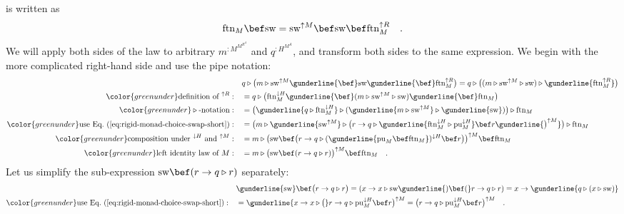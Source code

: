 is written as
\begin{equation}
\text{ftn}_{M}\bef\text{sw}=\text{sw}^{\uparrow M}\bef\text{sw}\bef\text{ftn}_{M}^{\uparrow R}\quad.\label{eq:swap-law-4-formulation-R-M}
\end{equation}
We will apply both sides of the law to arbitrary $m^{:M^{M^{R^{A}}}}$
and $q^{:H^{M^{A}}}$, and transform both sides to the same expression.
We begin with the more complicated right-hand side and use the pipe
notation:
\begin{align}
 & q\triangleright\big(m\triangleright\text{sw}^{\uparrow M}\gunderline{\bef}\text{sw}\gunderline{\bef}\text{ftn}_{M}^{\uparrow R}\big)=q\triangleright\big((m\triangleright\text{sw}^{\uparrow M}\triangleright\text{sw})\triangleright\gunderline{\text{ftn}_{M}^{\uparrow R}}\big)\nonumber \\
{\color{greenunder}\text{definition of }^{\uparrow R}:}\quad & =q\triangleright\big(\text{ftn}_{M}^{\downarrow H}\gunderline{\bef}(m\triangleright\text{sw}^{\uparrow M}\triangleright\text{sw})\gunderline{\bef}\text{ftn}_{M}\big)\nonumber \\
{\color{greenunder}\triangleright\text{-notation}:}\quad & =\big(\gunderline{q\triangleright\text{ftn}_{M}^{\downarrow H}}\triangleright(\gunderline{m\triangleright\text{sw}^{\uparrow M}}\triangleright\gunderline{\text{sw}})\big)\triangleright\text{ftn}_{M}\nonumber \\
{\color{greenunder}\text{use Eq.~(\ref{eq:rigid-monad-choice-swap-short})}:}\quad & =\big(m\triangleright\gunderline{\text{sw}^{\uparrow M}}\triangleright\big(r\rightarrow q\triangleright\gunderline{\text{ftn}_{M}^{\downarrow H}\triangleright\text{pu}_{M}^{\downarrow H}}\bef r\gunderline{\big)^{\uparrow M}}\big)\triangleright\text{ftn}_{M}\nonumber \\
{\color{greenunder}\text{composition under }^{\downarrow H}\text{ and }^{\uparrow M}:}\quad & =m\triangleright\big(\text{sw}\bef\big(r\rightarrow q\triangleright(\gunderline{\text{pu}_{M}\bef\text{ftn}_{M}})^{\downarrow H}\bef r\big)\big)^{\uparrow M}\bef\text{ftn}_{M}\nonumber \\
{\color{greenunder}\text{left identity law of }M:}\quad & =m\triangleright\big(\text{sw}\bef(r\rightarrow q\triangleright r)\big)^{\uparrow M}\bef\text{ftn}_{M}\quad.\label{eq:rigid-monad-1-swap-law-4-derivation-5}
\end{align}
Let us simplify the sub-expression $\text{sw}\bef(r\rightarrow q\triangleright r)$
separately:
\begin{align*}
 & \gunderline{\text{sw}}\bef\big(r\rightarrow q\triangleright r\big)=(x\rightarrow x\triangleright\text{sw}\gunderline{)\bef(}r\rightarrow q\triangleright r)=x\rightarrow\gunderline{q\triangleright(x\triangleright\text{sw})}\\
{\color{greenunder}\text{use Eq.~(\ref{eq:rigid-monad-choice-swap-short})}:}\quad & =\gunderline{x\rightarrow x\triangleright\big(}r\rightarrow q\triangleright\text{pu}_{M}^{\downarrow H}\bef r\big)^{\uparrow M}=\big(r\rightarrow q\triangleright\text{pu}_{M}^{\downarrow H}\bef r\big)^{\uparrow M}\quad.
\end{align*}

